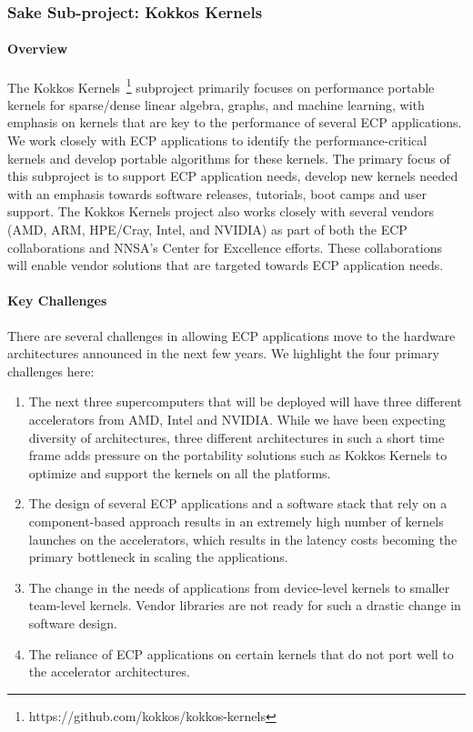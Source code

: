 \subsubsection{ Sake Sub-project: Kokkos Kernels} \label{subsubsect:kokkoskernels}
\paragraph{Overview} 
The Kokkos Kernels~\footnote{https://github.com/kokkos/kokkos-kernels} subproject primarily
focuses on performance portable kernels for sparse/dense linear algebra, graphs, and machine
learning, with emphasis on kernels that are key to the performance of
several ECP applications. We work closely with ECP applications to identify the
performance-critical kernels and develop portable algorithms for these kernels.
The primary focus of this subproject is to support ECP application needs, develop new
kernels needed with an emphasis towards software releases, tutorials, boot camps
and user support. The Kokkos Kernels project also works closely with several vendors
(AMD, ARM, HPE/Cray, Intel, and NVIDIA) as part of both the ECP collaborations and
NNSA's Center for Excellence efforts. These collaborations will enable vendor solutions
that are targeted towards ECP application needs.

\paragraph{Key  Challenges}
There are several challenges in allowing ECP applications move to the hardware architectures
announced in the next few years. We highlight the four primary challenges here:
\begin{enumerate}
\item 
The next three supercomputers that will be deployed will have
three different accelerators from AMD, Intel and NVIDIA. While we have been expecting diversity of architectures, three
different architectures in such a short time frame adds pressure on the portability
solutions such as Kokkos Kernels to optimize and support the kernels on all the platforms.
\item
The design of several ECP applications and a software stack that rely on a component-based
approach results in an extremely high number of kernels launches on the accelerators, which
results in the latency costs becoming the primary bottleneck in scaling the applications.
\item
The change in the needs of applications from device-level kernels to smaller team-level kernels. Vendor
libraries are not ready for such a drastic change in software design.
\item 
The reliance of ECP applications on certain kernels that do not port well to the accelerator architectures.
\end{enumerate}

